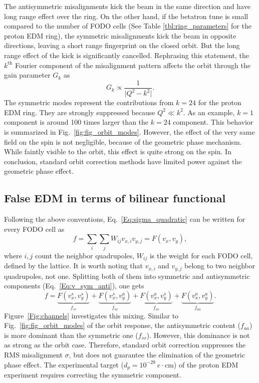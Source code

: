 \documentclass[aps,prab,reprint,superscriptaddress,nofootinbib]{revtex4-2}
\begin{document}
	The antisymmetric misalignments kick the beam in the same direction and have long range effect over the ring. On the other hand, if the betatron tune is small compared to the number of FODO cells (See Table \ref{tbl:ring_parameters} for the proton EDM ring), the symmetric misalignments kick the beam in opposite directions, leaving a short range fingerprint on the closed orbit. But the long range effect of the kick is significantly cancelled.
	Rephrasing this statement, the $k^\text{th}$ Fourier component of the misalignment pattern affects the orbit through the gain parameter $G_k$ as
	\begin{equation}
		G_k \propto \frac{1}{\vert Q^2 - k^2 \vert}.
		\label{Eq:orbit_gain}
	\end{equation}
	The symmetric modes represent the contributions from $k=24$ for the proton EDM ring. They are strongly suppressed because $Q^2 \ll k^2$. As an example, $k=1$ component is around 100 times larger than the $k=24$ component. This behavior is summarized in Fig.~\ref{fig:fig_orbit_modes}. However, the effect of the very same field on the spin is not negligible, because of the geometric phase mechanism. While faintly visible to the orbit, this effect is quite strong on the spin. In conclusion, standard orbit correction methods have limited power against the geometric phase effect.

	\subsection{False EDM in terms of bilinear functional}
	\label{sec:bilinear}
	Following the above conventions, Eq.~\eqref{Eq:sigma_quadratic} can be written for every FODO cell as
	\begin{equation}
		f =  \sum_i \sum_j W_{ij} v_{x,i}v_{y,j} = F(v_x, v_y),
	\end{equation}
	where $i,j$ count the neighbor quadrupoles, $W_{ij}$ is the weight for each FODO cell, defined by the lattice. It is worth noting that $v_{x,i}$ and $v_{y,j}$ belong to two neighbor quadrupoles, not one.
	Splitting both of them into symmetric and antisymmetric components (Eq.~\eqref{Eq:v_sym_anti}), one gets
	\begin{equation}
		f= \underbrace{F(v_x^s, v_y^s)}_{f_{ss}} +
		\underbrace{F(v_x^s, v_y^a)}_{f_{sa}} +
		\underbrace{F(v_x^a, v_y^s)}_{f_{as}} +
		\underbrace{F(v_x^a, v_y^a)}_{f_{aa}}.
	\end{equation}
	Figure~\ref{Fig:channels} investigates this mixing. Similar to Fig.~\ref{fig:fig_orbit_modes} of the orbit response, the antisymmetric content ($f_{aa}$) is more dominant than the symmetric one ($f_{ss}$). However, this dominance is not as strong as the orbit case. Therefore, standard orbit correction suppresses the RMS misalignment $\sigma$, but does not guarantee the elimination of the geometric phase effect. The experimental target ($d_p=10^{-29}~e \cdot$cm) of the proton EDM experiment requires correcting the symmetric component.
\end{document}
